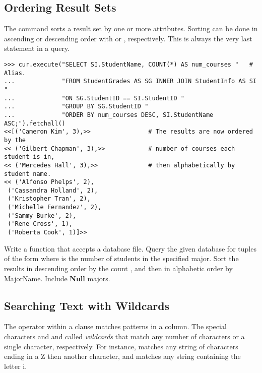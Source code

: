 \subsection*{Ordering Result Sets} %

The  command sorts a result set by one or more attributes.
Sorting can be done in ascending or descending order with  or , respectively.
This is always the very last statement in a query.

\begin{lstlisting}
>>> cur.execute("SELECT SI.StudentName, COUNT(*) AS num_courses "   # Alias.
...             "FROM StudentGrades AS SG INNER JOIN StudentInfo AS SI "
...             "ON SG.StudentID == SI.StudentID "
...             "GROUP BY SG.StudentID "
...             "ORDER BY num_courses DESC, SI.StudentName ASC;").fetchall()
<<[('Cameron Kim', 3),>>                # The results are now ordered by the
<< ('Gilbert Chapman', 3),>>            # number of courses each student is in,
<< ('Mercedes Hall', 3),>>              # then alphabetically by student name.
<< ('Alfonso Phelps', 2),
 ('Cassandra Holland', 2),
 ('Kristopher Tran', 2),
 ('Michelle Fernandez', 2),
 ('Sammy Burke', 2),
 ('Rene Cross', 1),
 ('Roberta Cook', 1)]>>
\end{lstlisting}

\begin{problem} %
Write a function that accepts a database file.
Query the given database for tuples of the form  where  is the number of students in the specified major.
Sort the results in descending order by the count , and then in alphabetic order by MajorName.
Include \textbf{Null} majors.
\end{problem}

\subsection*{Searching Text with Wildcards} %

The  operator within a  clause matches patterns in a  column.
The special characters \lsql{\%} and \lsql{_} and called \emph{wildcards} that match any number of characters or a single character, respectively.
For instance,  matches any string of characters ending in a Z then another character, and  matches any string containing the letter i.

